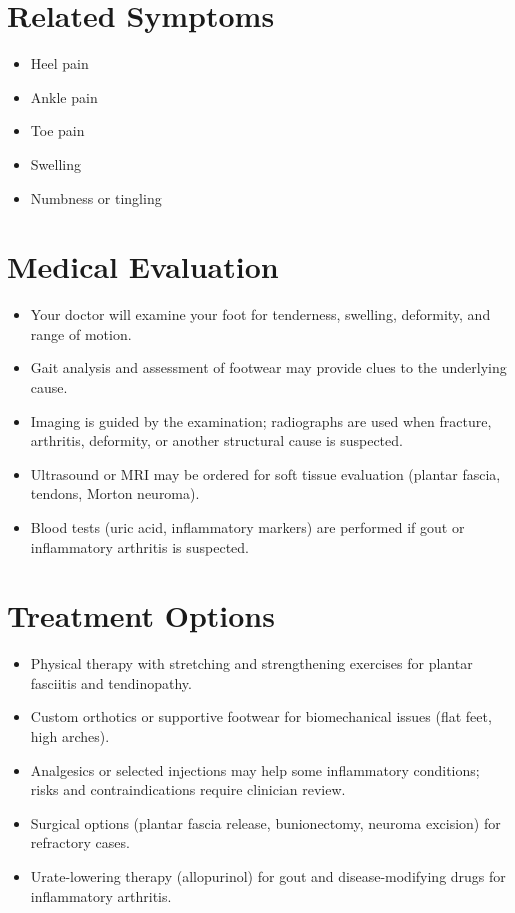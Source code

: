 \section*{Related Symptoms}
\begin{itemize}
  \item Heel pain
  \item Ankle pain
  \item Toe pain
  \item Swelling
  \item Numbness or tingling
\end{itemize}


\section*{Medical Evaluation}
\begin{itemize}
  \item Your doctor will examine your foot for tenderness, swelling, deformity, and range of motion.
  \item Gait analysis and assessment of footwear may provide clues to the underlying cause.
  \item Imaging is guided by the examination; radiographs are used when fracture, arthritis, deformity, or another structural cause is suspected.
  \item Ultrasound or MRI may be ordered for soft tissue evaluation (plantar fascia, tendons, Morton neuroma).
  \item Blood tests (uric acid, inflammatory markers) are performed if gout or inflammatory arthritis is suspected.
\end{itemize}

\section*{Treatment Options}
\begin{itemize}
  \item Physical therapy with stretching and strengthening exercises for plantar fasciitis and tendinopathy.
  \item Custom orthotics or supportive footwear for biomechanical issues (flat feet, high arches).
  \item Analgesics or selected injections may help some inflammatory conditions; risks and contraindications require clinician review.
  \item Surgical options (plantar fascia release, bunionectomy, neuroma excision) for refractory cases.
  \item Urate-lowering therapy (allopurinol) for gout and disease-modifying drugs for inflammatory arthritis.
\end{itemize}


